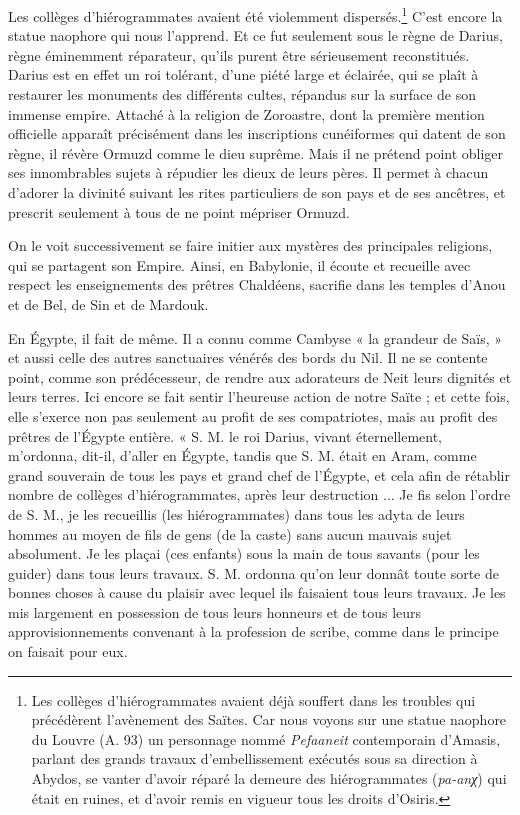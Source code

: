\documentclass[a4paper, 11pt, oneside]{article}
\begin{document}
Les collèges d'hiérogrammates avaient été violemment dispersés.\footnote{Les collèges d'hiérogrammates avaient déjà souffert dans les troubles qui précédèrent l'avènement des Saïtes. Car nous voyons sur une statue naophore du Louvre (A. 93) un personnage nommé \emph{Pefaaneit} contemporain d'Amasis, parlant des grands travaux d'embellissement exécutés sous sa direction à Abydos, se vanter d'avoir réparé la demeure des hiérogrammates (\emph{pa-anχ}) qui était en ruines, et d'avoir remis en vigueur tous les droits d'Osiris.} C'est encore la statue naophore qui nous l'apprend. Et ce fut seulement sous le règne de Darius, règne éminemment réparateur, qu'ils purent être sérieusement reconstitués. Darius est en effet un roi tolérant, d'une piété large et éclairée, qui se plaît à restaurer les monuments des différents cultes, répandus sur la surface de son immense empire. Attaché à la religion de Zoroastre, dont la première mention officielle apparaît précisément dans les inscriptions cunéiformes qui datent de son règne, il révère Ormuzd comme le dieu suprême. Mais il ne prétend point obliger ses innombrables sujets à répudier les dieux de leurs pères. Il permet à chacun d'adorer la divinité suivant les rites particuliers de son pays et de ses ancêtres, et prescrit seulement à tous de ne point mépriser Ormuzd.

On le voit successivement se faire initier aux mystères des principales religions, qui se partagent son Empire. Ainsi, en Babylonie, il écoute et recueille avec respect les enseignements des prêtres Chaldéens, sacrifie dans les temples d'Anou et de Bel, de Sin et de Mardouk.

En Égypte, il fait de même. Il a connu comme Cambyse « la grandeur de Saïs, » et aussi celle des autres sanctuaires vénérés des bords du Nil. Il ne se contente point, comme son prédécesseur, de rendre aux adorateurs de Neit leurs dignités et leurs terres. Ici encore se fait sentir l'heureuse action de notre Saïte ; et cette fois, elle s'exerce non pas seulement au profit de ses compatriotes, mais au profit des prêtres de l'Égypte entière. « S. M. le roi Darius, vivant éternellement, m'ordonna, dit-il, d'aller en Égypte, tandis que S. M. était en Aram, comme grand souverain de tous les pays et grand chef de l'Égypte, et cela afin de rétablir nombre de collèges d'hiérogrammates, après leur destruction ... Je fis selon l'ordre de S. M., je les recueillis (les hiérogrammates) dans tous les adyta de leurs hommes au moyen de fils de gens (de la caste) sans aucun mauvais sujet absolument. Je les plaçai (ces enfants) sous la main de tous savants (pour les guider) dans tous leurs travaux. S. M. ordonna qu'on leur donnât toute sorte de bonnes choses à cause du plaisir avec lequel ils faisaient tous leurs travaux. Je les mis largement en possession de tous leurs honneurs et de tous leurs approvisionnements convenant à la profession de scribe, comme dans le principe on faisait pour eux.
\end{document}
